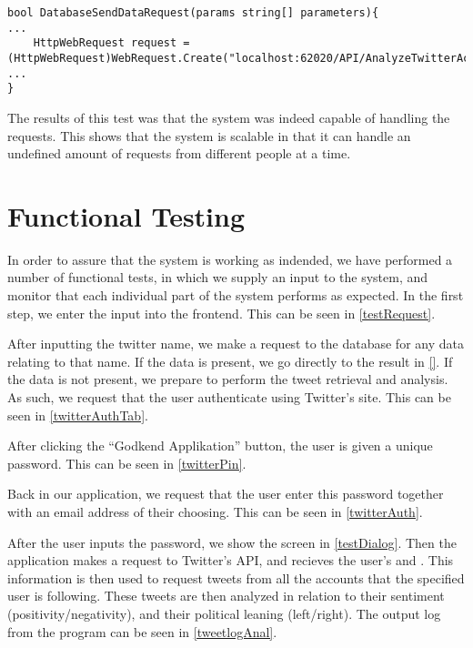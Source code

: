 \begin{minipage}[H]{\linewidth}
\begin{lstlisting}[caption = Code initiating the stress test, label = stressTestCode] 
bool DatabaseSendDataRequest(params string[] parameters){
...
	HttpWebRequest request = (HttpWebRequest)WebRequest.Create("localhost:62020/API/AnalyzeTwitterAccount");
...
}
\end{lstlisting}
\end{minipage}

The results of this test was that the system was indeed capable of handling the
requests. This shows that the system is scalable in that it can handle an
undefined amount of requests from different people at a time.


\section{Functional Testing}
In order to assure that the system is working as indended, we have performed a
number of functional tests, in which we supply an input to the system, and
monitor that each individual part of the system performs as expected. In the
first step, we enter the input into the frontend. This can be seen in
\autoref{testRequest}.\nl 


After inputting the twitter name, we make a request to the database for any data
relating to that name. If the data is present, we go directly to the result in
\autoref{}. If the data is not present, we prepare to perform the tweet
retrieval and analysis. As such, we request that the user authenticate using
Twitter's site. This can be seen in \autoref{twitterAuthTab}.\nl


After clicking the ``Godkend Applikation'' button, the user is given a unique
password. This can be seen in \autoref{twitterPin}.\nl


Back in our application, we request that the user enter this password
together with an email address of their choosing. This can be seen in
\autoref{twitterAuth}.\nl


After the user inputs the password, we show the screen in \autoref{testDialog}.
Then the application makes a request to Twitter's API, and recieves the user's
 and . This information is
then used to request tweets from all the accounts that the specified user is
following. These tweets are then analyzed in relation to their sentiment
(positivity/negativity), and their political leaning (left/right). The output
log from the program can be seen in \autoref{tweetlogAnal}. \nl

